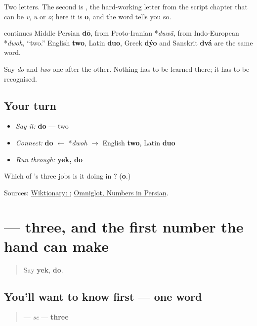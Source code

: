 Two letters. The second is \textbf{}, the hard-working letter from the script chapter that can be \emph{v}, \emph{u} or \emph{o}; here it is \textbf{o}, and the word tells you so.

\begin{cousinweb}
\textbf{} continues Middle Persian \textbf{dō}, from Proto-Iranian *\emph{duwā}, from Indo-European *\emph{dwoh}, \textquotedblleft{}two.\textquotedblright{} English \textbf{two}, Latin \textbf{duo}, Greek \textbf{dýo} and Sanskrit \textbf{dvá} are the same word.

Say \emph{do} and \emph{two} one after the other. Nothing has to be learned there; it has to be recognised.
\end{cousinweb}

\subsection*{Your turn}
\begin{itemize}
\raggedright
  \item \emph{Say it:} \textbf{do} — two
  \item \emph{Connect:} \textbf{do} $\leftarrow$ *\emph{dwoh} $\to$ English \textbf{two}, Latin \textbf{duo}
  \item \emph{Run through:} \textbf{yek, do}
\end{itemize}

\begin{tcolorbox}[breakable,colback=teal!4,colframe=teal!35!black,title={Before you move on}]
Which of 's three jobs is it doing in \textbf{}? (\textbf{o}.)

Sources: \href{https://en.wiktionary.org/wiki/\%D8\%AF\%D9\%88}{Wiktionary: }; \href{https://www.omniglot.com/language/numbers/persian.htm}{Omniglot, Numbers in Persian}.
\end{tcolorbox}
\section[\texorpdfstring{\fa{سه} (se)}{سه (se)}]{ — three, and the first number the hand can make}

\label{lesson:FA-C16-se}



\begin{quote}
Say \textbf{yek}, \textbf{do}.
\end{quote}

\subsection*{You'll want to know first — one word}
\begin{quote}
\textbf{} — \emph{se} — \textbf{three}
\end{quote}

